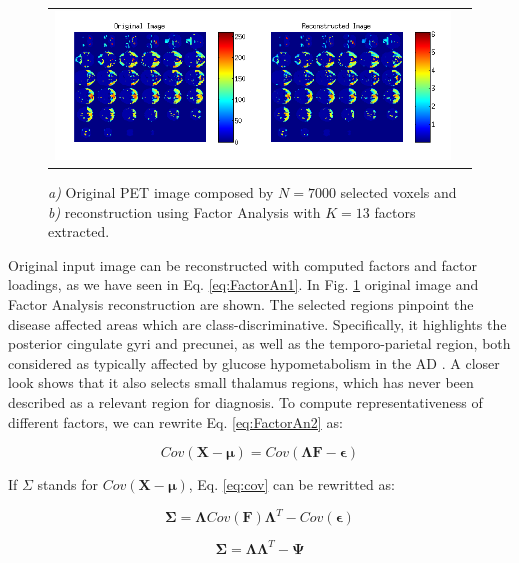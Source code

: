 \begin{figure}[htp]
	\centering
	\begin{tabular}{cc}
		\includegraphics[width=\linewidth]{Graphics/ch4/reconstruction}\\
	\end{tabular}
	\caption{\textit{a)} Original PET image composed by $N=7000$ selected voxels and \textit{b)} reconstruction using Factor Analysis with $K=13$ factors extracted.}
	\label{fig:reconstruction}
\end{figure}

Original input image can be reconstructed with computed factors and factor loadings, as we have seen in Eq. \ref{eq:FactorAn1}. In Fig. \ref{fig:reconstruction} original image and Factor Analysis reconstruction are shown. The selected regions pinpoint the disease affected areas which are class-discriminative. Specifically, it highlights the posterior cingulate gyri and precunei, as well as the temporo-parietal region, both considered as typically affected by glucose hypometabolism in the AD \cite{Claus1994}. A closer look shows that it also selects small thalamus regions, which has never been described as a relevant region for diagnosis. To compute representativeness of different factors, we can rewrite Eq. \ref{eq:FactorAn2} as:

\begin{equation}\label{eq:cov}
Cov (\textbf{X} - \boldsymbol\mu) = Cov(\boldsymbol\Lambda \textbf{F} - \boldsymbol\epsilon)
\end{equation}

If $\Sigma$ stands for $Cov (\textbf{X} - \boldsymbol\mu)$, Eq. \ref{eq:cov} can be rewritted as:

\begin{equation}
\boldsymbol\Sigma = \boldsymbol\Lambda Cov(\textbf{F}) \boldsymbol\Lambda^T - Cov(\boldsymbol\epsilon)
\end{equation}

\begin{equation}
\boldsymbol\Sigma = \boldsymbol\Lambda \boldsymbol\Lambda^T - \boldsymbol\Psi
\end{equation}

